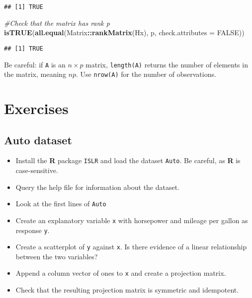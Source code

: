 \documentclass[]{book}
\newenvironment{Shaded}{\begin{snugshade}}{\end{snugshade}}
\newcommand{\CommentTok}[1]{\textcolor[rgb]{0.56,0.35,0.01}{\textit{#1}}}
\newcommand{\DataTypeTok}[1]{\textcolor[rgb]{0.13,0.29,0.53}{#1}}
\newcommand{\KeywordTok}[1]{\textcolor[rgb]{0.13,0.29,0.53}{\textbf{#1}}}
\newcommand{\NormalTok}[1]{#1}
\newcommand{\OperatorTok}[1]{\textcolor[rgb]{0.81,0.36,0.00}{\textbf{#1}}}
\newcommand{\OtherTok}[1]{\textcolor[rgb]{0.56,0.35,0.01}{#1}}
\providecommand{\tightlist}{%
  \setlength{\itemsep}{0pt}\setlength{\parskip}{0pt}}
\theoremstyle{definition}
\theoremstyle{definition}
\theoremstyle{definition}
\theoremstyle{remark}
\let\BeginKnitrBlock\begin \let\EndKnitrBlock\end
\begin{document}
\begin{verbatim}
## [1] TRUE
\end{verbatim}

\begin{Shaded}
\begin{Highlighting}[]
\CommentTok{#Check that the matrix has rank p}
\KeywordTok{isTRUE}\NormalTok{(}\KeywordTok{all.equal}\NormalTok{(Matrix}\OperatorTok{::}\KeywordTok{rankMatrix}\NormalTok{(Hx), p, }\DataTypeTok{check.attributes =} \OtherTok{FALSE}\NormalTok{))}
\end{Highlighting}
\end{Shaded}

\begin{verbatim}
## [1] TRUE
\end{verbatim}

\BeginKnitrBlock{rmdcaution}
Be careful: if \texttt{A} is an \(n \times p\) matrix,
\texttt{length(A)} returns the number of elements in the matrix, meaning
\(np\). Use \texttt{nrow(A)} for the number of observations.
\EndKnitrBlock{rmdcaution}

\hypertarget{exercises}{%
\section{Exercises}\label{exercises}}

\hypertarget{auto-dataset}{%
\subsection{Auto dataset}\label{auto-dataset}}

\begin{itemize}
\tightlist
\item
  Install the \textbf{R} package \texttt{ISLR} and load the dataset
  \texttt{Auto}. Be careful, as \textbf{R} is case-sensitive.
\item
  Query the help file for information about the dataset.
\item
  Look at the first lines of \texttt{Auto}
\item
  Create an explanatory variable \texttt{x} with horsepower and mileage
  per gallon as response \texttt{y}.
\item
  Create a scatterplot of \texttt{y} against \texttt{x}. Is there
  evidence of a linear relationship between the two variables?
\item
  Append a column vector of ones to \texttt{x} and create a projection
  matrix.
\item
  Check that the resulting projection matrix is symmetric and
  idempotent.
\end{itemize}
\end{document}
